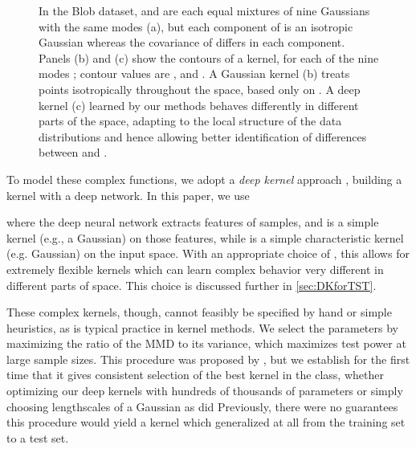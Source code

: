 \documentclass{article}
\begin{document}
\begin{figure*}[tp]
    \begin{center}
        \vspace{-0.3cm}
        \caption{In the Blob dataset,
         and  are each equal mixtures of nine Gaussians with the same modes (a),
        but each component of  is an isotropic Gaussian
        whereas the covariance of  differs in each component.
        Panels (b) and (c) show the contours of a kernel,
         for each of the nine modes ;
        contour values are ,  and .
A Gaussian kernel (b) treats points isotropically throughout the space, based only on .
        A deep kernel (c) learned by our methods behaves differently in different parts of the space, adapting to the local structure of the data distributions and hence allowing better identification of differences between  and .}
        \label{fig:moti}
    \end{center}
    \vspace{-1em}
\end{figure*}

To model these complex functions,
we adopt a \emph{deep kernel} approach \citep{wilson:deep-kernel-learning,sutherland:mmd-opt,Li2017,Jean2018,Kevin_ICML2019},
building a kernel with a deep network.
In this paper, we use

where the deep neural network  extracts features of samples,
and  is a simple kernel (e.g., a Gaussian) on those features,
while  is a simple characteristic kernel (e.g. Gaussian) on the input space.
With an appropriate choice of ,
this allows for extremely flexible kernels
which can learn complex behavior very different in different parts of space.
This choice is discussed further in \cref{sec:DKforTST}.

These complex kernels, though, cannot feasibly be specified by hand or simple heuristics, as is typical practice in kernel methods.
We select the parameters 
by maximizing the ratio of the MMD to its variance,
which maximizes test power at large sample sizes.
This procedure was proposed by \citet{sutherland:mmd-opt},
but we establish for the first time that it gives consistent selection of the best kernel in the class,
whether optimizing our deep kernels with hundreds of thousands of parameters
or simply choosing lengthscales of a Gaussian as did \citeauthor{sutherland:mmd-opt}
Previously, there were no guarantees this procedure would yield a kernel
which generalized at all from the training set to a test set.
\end{document}
